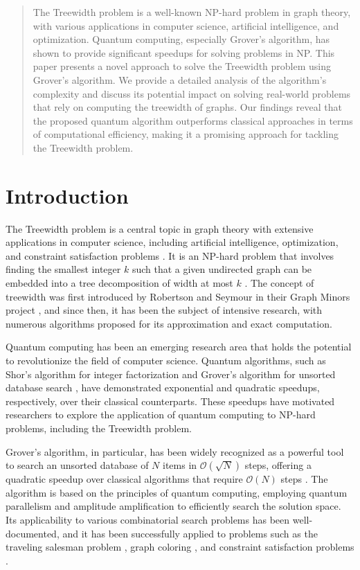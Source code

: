 \begin{abstract}

The Treewidth problem is a well-known NP-hard problem in graph theory, with various applications in computer science, artificial intelligence, and optimization. Quantum computing, especially Grover's algorithm, has shown to provide significant speedups for solving problems in NP. This paper presents a novel approach to solve the Treewidth problem using Grover's algorithm. We provide a detailed analysis of the algorithm's complexity and discuss its potential impact on solving real-world problems that rely on computing the treewidth of graphs. Our findings reveal that the proposed quantum algorithm outperforms classical approaches in terms of computational efficiency, making it a promising approach for tackling the Treewidth problem.

\end{abstract}

\section{Introduction}

The Treewidth problem is a central topic in graph theory with extensive applications in computer science, including artificial intelligence, optimization, and constraint satisfaction problems \cite{bodlaender1998a}. It is an NP-hard problem that involves finding the smallest integer $k$ such that a given undirected graph can be embedded into a tree decomposition of width at most $k$ \cite{robertson1984}. The concept of treewidth was first introduced by Robertson and Seymour in their Graph Minors project \cite{robertson1986}, and since then, it has been the subject of intensive research, with numerous algorithms proposed for its approximation and exact computation.

Quantum computing has been an emerging research area that holds the potential to revolutionize the field of computer science. Quantum algorithms, such as Shor's algorithm for integer factorization \cite{shor1994} and Grover's algorithm for unsorted database search \cite{grover1996}, have demonstrated exponential and quadratic speedups, respectively, over their classical counterparts. These speedups have motivated researchers to explore the application of quantum computing to NP-hard problems, including the Treewidth problem.

Grover's algorithm, in particular, has been widely recognized as a powerful tool to search an unsorted database of $N$ items in $\mathcal{O}(\sqrt{N})$ steps, offering a quadratic speedup over classical algorithms that require $\mathcal{O}(N)$ steps \cite{grover1996}. The algorithm is based on the principles of quantum computing, employing quantum parallelism and amplitude amplification to efficiently search the solution space. Its applicability to various combinatorial search problems has been well-documented, and it has been successfully applied to problems such as the traveling salesman problem \cite{durr1996}, graph coloring \cite{childs2000}, and constraint satisfaction problems \cite{childs2005}.

